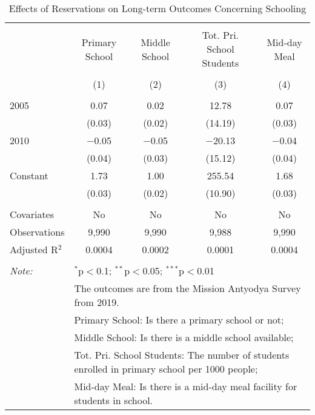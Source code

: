 
\begin{table}[!htbp] \centering 
  \caption{Effects of Reservations on Long-term Outcomes Concerning Schooling} 
  \label{up_shrug_schooling_05_10} 
\scriptsize 
\begin{tabular}{@{\extracolsep{0pt}}lcccc} 
\\[-1.8ex]\hline 
\hline \\[-1.8ex] 
 & Primary School & Middle School & Tot. Pri. School Students & Mid-day Meal \\ 
\\[-1.8ex] & (1) & (2) & (3) & (4)\\ 
\hline \\[-1.8ex] 
 2005 & 0.07 & 0.02 & 12.78 & 0.07 \\ 
  & (0.03) & (0.02) & (14.19) & (0.03) \\ 
  2010 & $-$0.05 & $-$0.05 & $-$20.13 & $-$0.04 \\ 
  & (0.04) & (0.03) & (15.12) & (0.04) \\ 
  Constant & 1.73 & 1.00 & 255.54 & 1.68 \\ 
  & (0.03) & (0.02) & (10.90) & (0.03) \\ 
 \hline \\[-1.8ex] 
Covariates & No & No & No & No \\ 
Observations & 9,990 & 9,990 & 9,988 & 9,990 \\ 
Adjusted R$^{2}$ & 0.0004 & 0.0002 & 0.0001 & 0.0004 \\ 
\hline 
\hline \\[-1.8ex] 
\textit{Note:}  & \multicolumn{4}{l}{$^{*}$p$<$0.1; $^{**}$p$<$0.05; $^{***}$p$<$0.01} \\ 
 & \multicolumn{4}{l}{The outcomes are from the Mission Antyodya Survey from 2019.} \\ 
 & \multicolumn{4}{l}{Primary School: Is there a primary school or not;} \\ 
 & \multicolumn{4}{l}{Middle School: Is there is a middle school available;} \\ 
 & \multicolumn{4}{l}{Tot. Pri. School Students: The number of students enrolled in primary school per 1000 people;} \\ 
 & \multicolumn{4}{l}{Mid-day Meal: Is there is a mid-day meal facility for students in school.} \\ 
\end{tabular} 
\end{table} 
